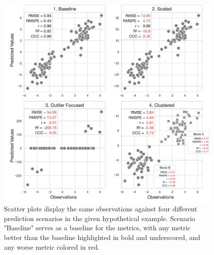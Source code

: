\begin{figure}
    \centering
    \includegraphics[width=.9\textwidth]{fig_s4_reg.jpg}
    \caption{Scatter plots display the same observations against four different prediction scenarios in the given hypothetical example. Scenario "Baseline" serves as a baseline for the metrics, with any metric better than the baseline highlighted in bold and underscored, and any worse metric colored in red.}
    \label{fig:s4_reg}
\end{figure}

